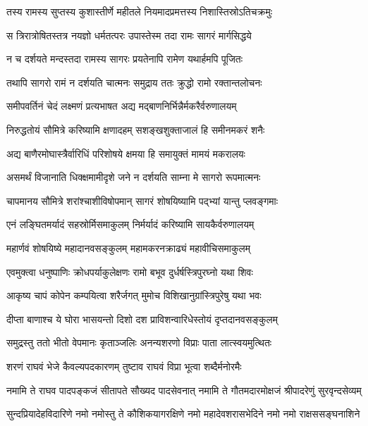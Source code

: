 \twolineshloka
{तस्य रामस्य सुप्तस्य कुशास्तीर्णे महीतले}
{नियमादप्रमत्तस्य निशास्तिस्रोऽतिचक्रमुः}%

\twolineshloka
{स त्रिरात्रोषितस्तत्र नयज्ञो धर्मतत्परः}
{उपास्तेस्म तदा रामः सागरं मार्गसिद्धये}%

\twolineshloka
{न च दर्शयते मन्दस्तदा रामस्य सागरः}
{प्रयतेनापि रामेण यथार्हमपि पूजितः}%

\twolineshloka
{तथापि सागरो रामं न दर्शयति चात्मनः}
{समुद्राय ततः क्रुद्धो रामो रक्तान्तलोचनः}%

\twolineshloka
{समीपवर्तिनं चेदं लक्ष्मणं प्रत्यभाषत}
{अद्य मद्बाणनिर्भिन्नैर्मकरैर्वरुणालयम्}%

\twolineshloka
{निरुद्धतोयं सौमित्रे करिष्यामि क्षणादहम्}
{सशङ्खशुक्ताजालं हि समीनमकरं शनैः}%

\twolineshloka
{अद्य बाणैरमोघास्त्रैर्वारिधिं परिशोषये}
{क्षमया हि समायुक्तं मामयं मकरालयः}%

\twolineshloka
{असमर्थं विजानाति धिक्क्षमामीदृशे जने}
{न दर्शयति साम्ना मे सागरो रूपमात्मनः}%

\twolineshloka
{चापमानय सौमित्रे शरांश्चाशीविषोपमान्}
{सागरं शोषयिष्यामि पद्भ्यां यान्तु प्लवङ्गमाः}%

\twolineshloka
{एनं लङ्घितमर्यादं सहस्रोर्मिसमाकुलम्}
{निर्मर्यादं करिष्यामि सायकैर्वरुणालयम्}%

\twolineshloka
{महार्णवं शोषयिष्ये महादानवसङ्कुलम्}
{महामकरनक्राढ्यं महावीचिसमाकुलम्}%

\twolineshloka
{एवमुक्त्वा धनुष्पाणिः क्रोधपर्याकुलेक्षणः}
{रामो बभूव दुर्धर्षस्त्रिपुरघ्नो यथा शिवः}%

\twolineshloka
{आकृष्य चापं कोपेन कम्पयित्वा शरैर्जगत्}
{मुमोच विशिखानुग्रांस्त्रिपुरेषु यथा भवः}%

\twolineshloka
{दीप्ता बाणाश्च ये घोरा भासयन्तो दिशो दश}
{प्राविशन्वारिधेस्तोयं दृप्तदानवसङ्कुलम्}%

\twolineshloka
{समुद्रस्तु ततो भीतो वेपमानः कृताञ्जलिः}
{अनन्यशरणो विप्राः पाता लात्स्वयमुत्थितः}%

\twolineshloka
{शरणं राघवं भेजे कैवल्यपदकारणम्}
{तुष्टाव राघवं विप्रा भूत्वा शब्दैर्मनोरमैः}%


\twolineshloka
{नमामि ते राघव पादपङ्कजं सीतापते सौख्यद पादसेवनात्}
{नमामि ते गौतमदारमोक्षजं श्रीपादरेणुं सुरवृन्दसेव्यम्}%

\twolineshloka
{सुन्दप्रियादेहविदारिणे नमो नमोस्तु ते कौशिकयागरक्षिणे}
{नमो महादेवशरासभेदिने नमो नमो राक्षससङ्घनाशिने}%

